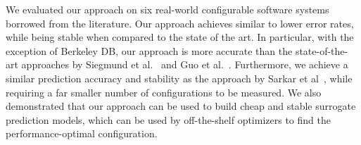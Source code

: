 \documentclass{newsig}
\newcommand{\tion}[1]{\S\ref{sect:#1}}
\begin{document}
We evaluated our approach on six real-world configurable software systems borrowed from the literature. Our approach achieves similar to lower error rates, while being stable when compared to the state of the art. In particular, with the exception of Berkeley DB, our approach is more accurate than the state-of-the-art approaches by Siegmund et al.~\cite{siegmund2012predicting} and Guo et al.~\cite{guo2013variability}. Furthermore, we achieve a similar prediction accuracy and stability as the approach by Sarkar et al~\cite{sarkar2015cost}, while requiring a far smaller number of configurations to be measured. We also demonstrated that our approach can be used to build cheap and stable surrogate prediction models, which can be used by off-the-shelf optimizers to find the performance-optimal configuration. 






\balance
  
\end{document}
